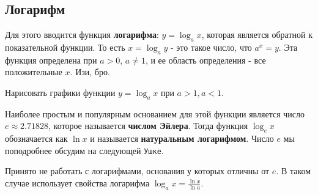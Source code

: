 \subsection{Логарифм}
Для этого вводится функция \textbf{логарифма}: $y = \log_a x$, которая является обратной к показательной функции. То есть $x = \log_a y$ - это такое число, что $a^x = y$.
Эта функция определена при $a > 0$, $a \neq 1$, и ее область определения - все положительные $x$. Изи, бро.
\begin{prac}
    Нарисовать графики функции $y = \log_a x$ при $a > 1, a < 1$.
\end{prac}
Наиболее простым и популярным основанием для этой функции является число $e \approx 2.71828$, которое называется \textbf{числом Эйлера}. Тогда функция $\log_e x$ обозначается как $\ln x$ и называется \textbf{натуральным логарифмом}. 
Число $e$ мы поподробнее обсудим на следующей \texttt{Ушке}.


\begin{remark}
    Принято не работать с логарифмами, основания у которых отличны от $e$. В таком случае использует свойства логарифма $\log_a x = \frac{\ln x}{\ln a}$.
\end{remark}